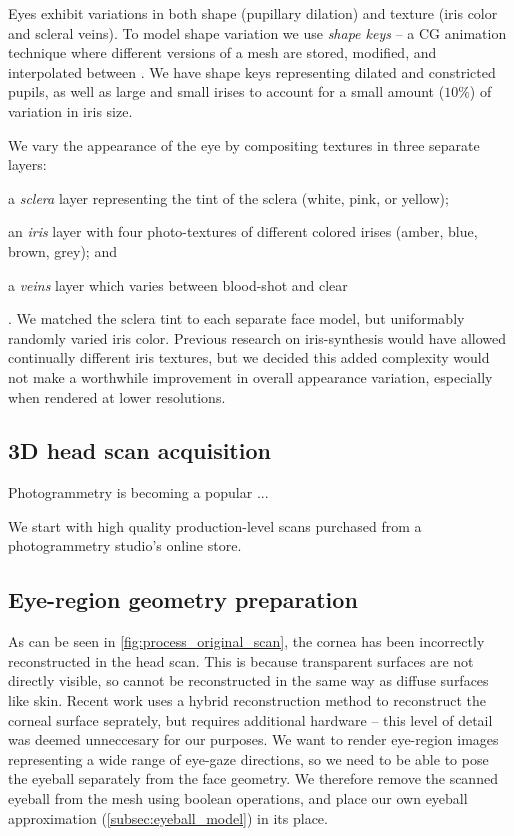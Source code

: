 Eyes exhibit variations in both shape (pupillary dilation) and texture (iris color and scleral veins). To model shape variation we use \emph{shape keys} -- a CG animation technique where different versions of a mesh are stored, modified, and interpolated between \cite{orvalho2012facial}.  We have shape keys representing dilated and constricted pupils, as well as large and small irises to account for a small amount ($10\%$) of variation in iris size.

We vary the appearance of the eye by compositing textures in three separate layers:
\begin{inparaenum}
\item a \emph{sclera} layer representing the tint of the sclera (white, pink, or yellow);
\item an \emph{iris} layer with four photo-textures of different colored irises (amber, blue, brown, grey); and
\item a \emph{veins} layer which varies between blood-shot and clear
\end{inparaenum}. We matched the sclera tint to each separate face model, but uniformably randomly varied iris color. Previous research on iris-synthesis  would have allowed continually different iris textures, but we decided this added complexity would not make a worthwhile improvement in overall appearance variation, especially when rendered at lower resolutions.

\subsection{3D head scan acquisition}



Photogrammetry is becoming a popular ...

We start with high quality production-level scans purchased from a photogrammetry studio's online store.

\subsection{Eye-region geometry preparation}

As can be seen in \autoref{fig:process_original_scan}, the cornea has been incorrectly reconstructed in the head scan. This is because transparent surfaces are not directly visible, so cannot be reconstructed in the same way as diffuse surfaces like skin. Recent work uses a hybrid reconstruction method to reconstruct the corneal surface seprately, but requires additional hardware \cite{berard2014highquality} -- this level of detail was deemed unneccesary for our purposes. We want to render eye-region images representing a wide range of eye-gaze directions, so we need to be able to pose the eyeball separately from the face geometry. We therefore remove the scanned eyeball from the mesh using boolean operations, and place our own eyeball approximation (\autoref{subsec:eyeball_model}) in its place.


